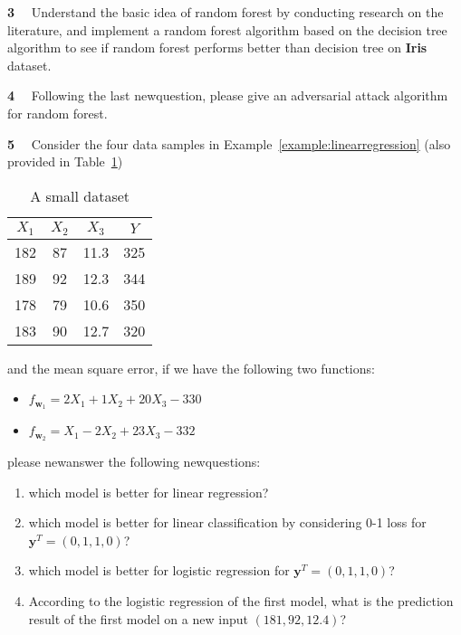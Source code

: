 \begin{newquestion}{\textbf{3}~~}
Understand the basic idea of random forest by conducting research on the literature, and implement a random forest algorithm based on the decision tree algorithm to see if random forest performs better than decision tree on \textbf{Iris} dataset. 
\end{newquestion}

\begin{newquestion}{\textbf{4}~~}
Following the last newquestion, please give an adversarial attack algorithm for random forest. 
\end{newquestion}

\begin{newquestion}{\textbf{5}~~}\label{newquestion:linearregression}
Consider the four data samples in Example~\ref{example:linearregression} (also provided in Table~\ref{tab:footballplayers2}) 
\begin{table}[h!]
    \centering
    \begin{tabular}{|c|c|c|c|}
    \hline
      $X_1$   & $X_2$ & $X_3$ & $Y$ \\
      \hline
      182   & 87 & 11.3 & 325 \\
      189   & 92 & 12.3 & 344 \\
      178   & 79 & 10.6 & 350 \\
      183   & 90 & 12.7 & 320 \\
      \hline
    \end{tabular}
    \caption{A small dataset}
    \label{tab:footballplayers2}
\end{table}
and the mean square error, if we have the following two functions: 
\begin{itemize}
    \item $f_{\textbf{w}_1}=2X_1+1X_2+20X_3-330$
    \item $f_{\textbf{w}_2}=X_1-2X_2+23X_3-332$
\end{itemize}
please newanswer the following newquestions:
\begin{enumerate}
    \item which model is better for linear regression?
    \item which model is better for linear classification
 	   by considering 0-1 loss for $\textbf{y}^T=(0,1,1,0)$?
 	  \item which model is better for logistic regression for $\textbf{y}^T=(0,1,1,0)$? 
 	  \item According to the logistic regression of the first model, what is the prediction result of the first model on a new input $(181,92,12.4)$?
\end{enumerate}
\end{newquestion}
